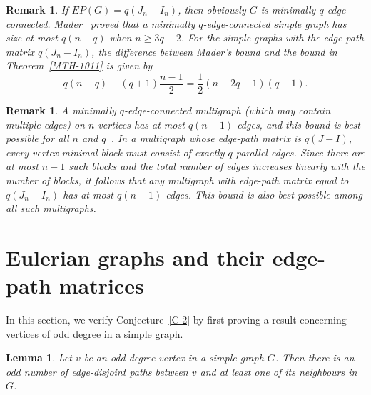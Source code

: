 \documentclass{article}
\newtheorem{lemma}[theorem]{Lemma}
\newtheorem{remark}[theorem]{Remark}
\begin{document}
\begin{remark}
If \(EP(G) = q(J_n - I_n)\), then obviously \(G\) is minimally \(q\)-edge-connected. Mader~\cite{Mader} proved that a minimally \(q\)-edge-connected simple graph has size at most \(q(n - q)\) when \(n \geq 3q - 2\). For the simple graphs with the edge-path matrix \(q(J_n - I_n)\), the difference between Mader's bound and the bound in Theorem~\ref{MTH-1011} is  given by
\[
q(n - q) - (q+1)\frac{n-1}{2} = \frac{1}{2}(n - 2q - 1)(q - 1).
\]
\end{remark}

\begin{remark}
A minimally \(q\)-edge-connected multigraph (which may contain multiple edges) on \(n\) vertices has at most \(q(n - 1)\) edges, and this bound is best possible for all \(n\) and \(q\)~\cite{Mader}. In a multigraph whose edge-path matrix is \(q(J - I)\), every vertex-minimal block must consist of exactly \(q\) parallel edges. Since there are at most \(n - 1\) such blocks and the total number of edges increases linearly with the number of blocks, it follows that any multigraph with edge-path matrix equal to \(q(J_n - I_n)\) has at most \(q(n - 1)\) edges. This bound is also best possible among all such multigraphs.
\end{remark}

\section{Eulerian graphs and their edge-path matrices }

In this section, we verify Conjecture~\ref{C-2} by first proving a result concerning vertices of odd degree in a simple graph.
\begin{lemma}\label{ML-2222}
Let \(v\) be an odd degree vertex in a simple graph \(G\). Then there is an odd number of edge‑disjoint paths between \(v\) and at least one of its neighbours in \(G\).
\end{lemma}
\end{document}
